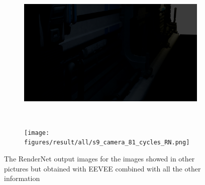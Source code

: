 \begin{figure}[h!]
    \centering
    \begin{subfigure}[b]{0.9\textwidth}
     \includegraphics[width=\textwidth]{figures/result/all/s9_camera_9_cycles_RN.png}
     \caption{}\label{subfig:1}
    \end{subfigure}
    \\ \vspace{0.2cm}
    \begin{subfigure}[b]{0.9\textwidth}
     \texttt{[image: figures/result/all/s9\_camera\_81\_cycles\_RN.png]}
     \caption{}
    \end{subfigure}
    
    \caption{The RenderNet output images for the images showed in other pictures but obtained with EEVEE combined with all the other information}
    \label{fig:rendernet_images}
\end{figure}

